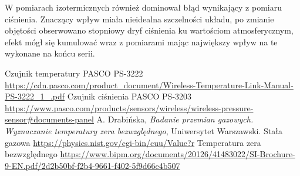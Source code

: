 \documentclass[12pt]{article}
\begin{document}
W pomiarach izotermicznych również dominował błąd wynikający z pomiaru ciśnienia. Znaczący wpływ miała nieidealna szczelności układu, po zmianie objętości obserwowano stopniowy dryf ciśnienia ku wartościom atmosferycznym, efekt mógł się kumulować wraz z pomiarami mając największy wpływ na te wykonane na końcu serii.

\vspace{1 in}

\begin{thebibliography}{5}
   Czujnik temperatury PASCO PS-3222 \url{https://cdn.pasco.com/product_document/Wireless-Temperature-Link-Manual-PS-3222_1_.pdf}
     Czujnik ciśnienia PASCO PS-3203 \url{https://www.pasco.com/products/sensors/wireless/wireless-pressure-sensor#documents-panel}
        A. Drabińska, \emph{Badanie przemian gazowych. Wyznaczanie temperatury zera bezwzględnego}, Uniwersytet Warszawski.
     Stała gazowa \url{https://physics.nist.gov/cgi-bin/cuu/Value?r}
          Temperatura zera bezwzględnego \url{https://www.bipm.org/documents/20126/41483022/SI-Brochure-9-EN.pdf/2d2b50bf-f2b4-9661-f402-5f9d66e4b507}
\end{thebibliography}
\end{document}
